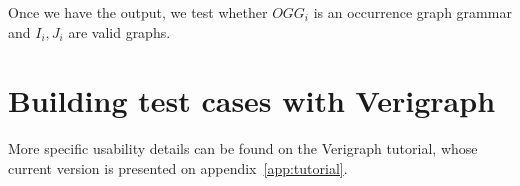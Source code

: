\begin{example}
\end{example}

\begin{example}
\end{example}

Once we have the output, we test whether $OGG_i$ is an occurrence graph grammar and $I_i, J_i$ are valid graphs.

\begin{example}[]
\end{example}

\section{Building test cases with Verigraph}

More specific usability details can be found on the Verigraph tutorial, whose current version is presented on appendix~\ref{app:tutorial}.
